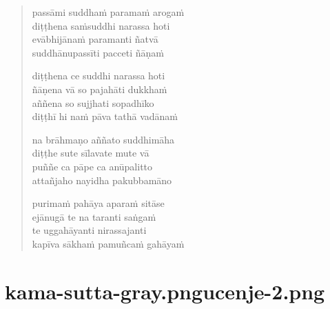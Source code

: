 

\cleartoverso

\vspace*{30mm}

\begin{verse}

passāmi suddhaṁ paramaṁ arogaṁ\\
diṭṭhena saṁsuddhi narassa hoti\\
evābhijānaṁ paramanti ñatvā\\
suddhānupassīti pacceti ñāṇaṁ

diṭṭhena ce suddhi narassa hoti\\
ñāṇena vā so pajahāti dukkhaṁ\\
aññena so sujjhati sopadhīko\\
diṭṭhī hi naṁ pāva tathā vadānaṁ

na brāhmaṇo aññato suddhimāha\\
diṭṭhe sute sīlavate mute vā\\
puññe ca pāpe ca anūpalitto\\
attañjaho nayidha pakubbamāno

purimaṁ pahāya aparaṁ sitāse\\
ejānugā te na taranti saṅgaṁ\\
te uggahāyanti nirassajanti\\
kapīva sākhaṁ pamuñcaṁ gahāyaṁ

\end{verse}


\chapter[Suddhaṭṭhaka Sutta]{{kama-sutta-gray.png}{ucenje-2.png}}

